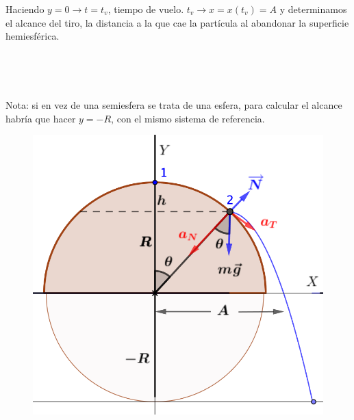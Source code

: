 Haciendo $y=0 \to t=t_v$, tiempo de vuelo. $t_v \to x=x(t_v)=A$ y determinamos el alcance del tiro, la distancia a la que cae la partícula al abandonar la superficie hemiesférica.

\begin{multicols}{2}
$\quad$

$\quad$

Nota: si en vez de una semiesfera se trata de una esfera, para calcular el alcance habría que hacer $y=-R$, con el mismo sistema de referencia.

\begin{figure}[H]
	\centering
	\includegraphics[width=.4\textwidth]{imagenes/imagenes04/T04IM23.png}
\end{figure}
\end{multicols}


\newpage %

